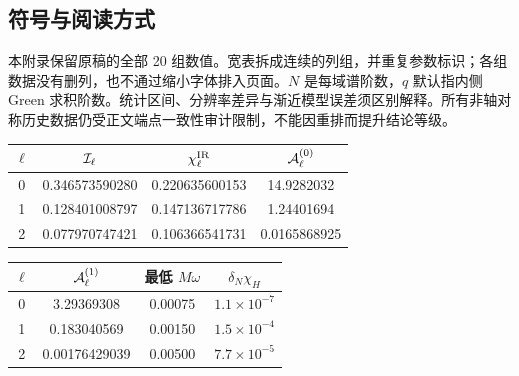 \documentclass[UTF8,fontset=fandol,11pt,a4paper,oneside]{ctexart}
\numberwithin{equation}{section}
\begin{document}
\subsection*{符号与阅读方式}
本附录保留原稿的全部 20 组数值。宽表拆成连续的列组，并重复参数标识；各组数据没有删列，也不通过缩小字体排入页面。$N$ 是每域谱阶数，$q$ 默认指内侧 Green 求积阶数。统计区间、分辨率差异与渐近模型误差须区别解释。所有非轴对称历史数据仍受正文端点一致性审计限制，不能因重排而提升结论等级。
\par\addvspace{14pt}
\noindent\begin{minipage}{\linewidth}
\captionsetup{type=table}\caption{轴对称红外解析系数与复视界振幅检验。}\label{audit:tab:axisymmetric-infrared}
\centering\fontsize{10}{13.5}\selectfont
\setlength{\tabcolsep}{6pt}\renewcommand{\arraystretch}{1.2}
\par{}\par\smallskip
\begin{tabular}{cccc}\toprule
$\ell$ & ${\cal I}_\ell$ & $\chi^{\rm IR}_\ell$ & ${\cal A}^{(0)}_\ell$\\\midrule
0 & 0.346573590280 & 0.220635600153 & 14.9282032\\
1 & 0.128401008797 & 0.147136717786 & 1.24401694\\
2 & 0.077970747421 & 0.106366541731 & 0.0165868925\\
\bottomrule\end{tabular}
\par\medskip
\par{}\par\smallskip
\begin{tabular}{cccc}\toprule
$\ell$ & ${\cal A}^{(1)}_\ell$ & 最低 $M\omega$ & $\delta_N\chi_H$\\\midrule
0 & 3.29369308 & 0.00075 & $1.1\times10^{-7}$\\
1 & 0.183040569 & 0.00150 & $1.5\times10^{-4}$\\
2 & 0.00176429039 & 0.00500 & $7.7\times10^{-5}$\\
\bottomrule\end{tabular}
\end{minipage}\par\addvspace{10pt}
\par\addvspace{14pt}
\end{document}
